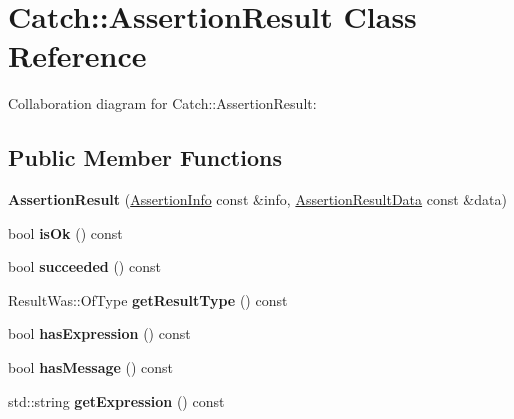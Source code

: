 \hypertarget{classCatch_1_1AssertionResult}{}\section{Catch\+:\+:Assertion\+Result Class Reference}
\label{classCatch_1_1AssertionResult}


Collaboration diagram for Catch\+:\+:Assertion\+Result\+:
\subsection*{Public Member Functions}
\begin{DoxyCompactItemize}
\item 
{\bfseries Assertion\+Result} (\hyperlink{structCatch_1_1AssertionInfo}{Assertion\+Info} const \&info, \hyperlink{structCatch_1_1AssertionResultData}{Assertion\+Result\+Data} const \&data)\hypertarget{classCatch_1_1AssertionResult_ab58aeec27052ba400633ed0e36cea692}{}\label{classCatch_1_1AssertionResult_ab58aeec27052ba400633ed0e36cea692}

\item 
bool {\bfseries is\+Ok} () const \hypertarget{classCatch_1_1AssertionResult_a70fb6aa62a38db3bdcafb4bb134afb21}{}\label{classCatch_1_1AssertionResult_a70fb6aa62a38db3bdcafb4bb134afb21}

\item 
bool {\bfseries succeeded} () const \hypertarget{classCatch_1_1AssertionResult_a5404062147930354afeb154de7cbaa7e}{}\label{classCatch_1_1AssertionResult_a5404062147930354afeb154de7cbaa7e}

\item 
Result\+Was\+::\+Of\+Type {\bfseries get\+Result\+Type} () const \hypertarget{classCatch_1_1AssertionResult_aa90bec8064879a62fcdc8e1079bcdba1}{}\label{classCatch_1_1AssertionResult_aa90bec8064879a62fcdc8e1079bcdba1}

\item 
bool {\bfseries has\+Expression} () const \hypertarget{classCatch_1_1AssertionResult_a45551f4f092c640ffce0cdd8a94f4b62}{}\label{classCatch_1_1AssertionResult_a45551f4f092c640ffce0cdd8a94f4b62}

\item 
bool {\bfseries has\+Message} () const \hypertarget{classCatch_1_1AssertionResult_ab22a1c9baa182aeb2549fffeb8294d9e}{}\label{classCatch_1_1AssertionResult_ab22a1c9baa182aeb2549fffeb8294d9e}

\item 
std\+::string {\bfseries get\+Expression} () const \hypertarget{classCatch_1_1AssertionResult_a6105300b90d66b5c11b69813f83d074d}{}\label{classCatch_1_1AssertionResult_a6105300b90d66b5c11b69813f83d074d}


\end{DoxyCompactItemize}

